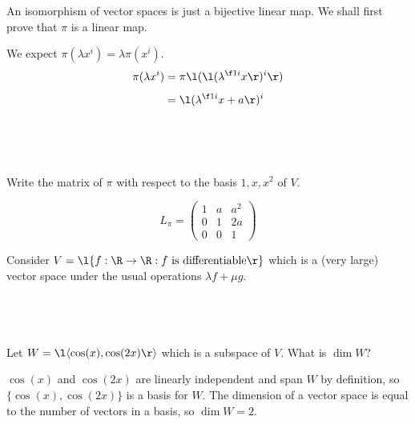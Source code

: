 \documentclass[a4paper]{article}
\begin{document}
An isomorphism of vector spaces is just a bijective linear map. We shall first prove that $\pi$ is a linear map.

We expect $\pi(\lambda x^i) = \lambda \pi(x^i)$. \begin{align*}
\pi(\lambda x^i) &= \pi\l( \l( \lambda^{\f1i} x \r)^i \r)\\[1ex]
&= \l( \lambda^{\f1i} x + a \r)^i\\[1ex]
\end{align*}


\subsection{~} %

\begin{questionbody}
Write the matrix of $\pi$ with respect to the basis $1, x, x^2$ of $V$.
\end{questionbody}

$$L_\pi = \begin{pmatrix} 1 & a & a^2\\ 0 & 1 & 2a \\ 0 & 0 & 1 \end{pmatrix}$$



\begin{questionbody}
Consider $V = \l\{ f : \R \to \R : f \text{ is differentiable} \r\}$ which is a (very large) vector space under the usual operations $\lambda f + \mu g$.
\end{questionbody}

\subsection{~} %

\begin{questionbody}
Let $W = \l\langle \cos(x), \cos(2x) \r\rangle$ which is a subspace of $V$. What is $\dim W$?
\end{questionbody}

$\cos(x)$ and $\cos(2x)$ are linearly independent and span $W$ by definition, so $\{\cos(x), \cos(2x)\}$ is a basis for $W$. The dimension of a vector space is equal to the number of vectors in a basis, so $\dim W = 2$.

\subsection{~} %
\end{document}
